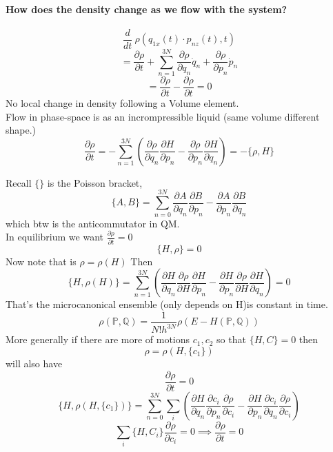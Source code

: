 \documentclass[11pt]{book}
\theoremstyle{definition}
\begin{document}
\paragraph{How does the density change as we flow with the system?}
\[ \frac{d}{dt} \: \rho(q_{1x}(t) \cdot p_{nz}(t), t) \]
\[ = \frac{\partial \rho}{\partial t} + \sum_{n=1}^{3N} \frac{\partial \rho}{\partial q_n} \dot q_n + \frac{\partial \rho}{\partial p_n} \dot p_n\] 
\[  = \frac{\partial \rho }{\partial t} - \frac{\partial \rho}{\partial t}   = 0\] 
No local change in density following a Volume element. \\
Flow in phase-space is as an incrompressible liquid (same volume different shape.) \\
\[ \frac{\partial \rho}{\partial t}  = -\sum_{n=1}^{3N} \left( \frac{\partial \rho}{\partial q_n} \frac{\partial H}{\partial p_n} - \frac{\partial \rho}{\partial p_n} \frac{\partial H}{\partial q_n} \right) = -\{\rho, H\} \] 

Recall $ \{\} $ is the Poisson bracket,
\[ \{A,B\} = \sum_{n=0}^{3N} \frac{\partial A}{\partial q_n} \frac{\partial B}{\partial p_n} - \frac{\partial A}{\partial p_n} \frac{\partial B}{\partial q_n}  \] 
which btw is the anticommutator in QM. \\

In equilibrium we want $ \frac{\partial \rho}{\partial t} = 0 $ 
\[ \{H, \rho\} = 0 \] 
Now note that is $ \rho = \rho(H) $ 
Then 
\[ \{H, \rho(H)\} = \sum_{n=1}^{3N} \left( \frac{\partial H}{\partial q_n} \frac{\partial \rho}{\partial H} \frac{\partial H}{\partial p_n} - \frac{\partial H}{\partial p_n} \frac{\partial \rho}{\partial H} \frac{\partial H}{\partial q_n} \right) = 0  \] 
That's the microcanonical ensemble (only depends on H)is constant in time.
\[ \rho(\mathbb{P},\mathbb{Q}) = \frac{1}{N!h^{3N}} \rho(E - H(\mathbb{P},\mathbb{Q}))\] 
More generally if there are more of motions $ c_1, c_2 $ so that $ \{H,C\} = 0 $ then 
\[ \rho = \rho(H, \{c_1\}) \] will also have \[ \frac{\partial \rho}{\partial t} = 0  \] 
\[ \{H, \rho(H, \{c_1\}) \} = \sum_{n=0}^{3N}\sum_{i} \left( \frac{\partial H}{\partial q_n} \frac{\partial c_i}{\partial p_n} \frac{\partial \rho}{\partial c_i} - \frac{\partial H}{\partial p_n}\frac{\partial c_i}{\partial q_n} \frac{\partial \rho}{\partial c_i}   \right)  \] 
\[ \sum_{i} \{H, C_i\} \frac{\partial \rho}{\partial c_i} = 0 \implies \frac{\partial \rho}{\partial t} = 0 \] 
\end{document}

